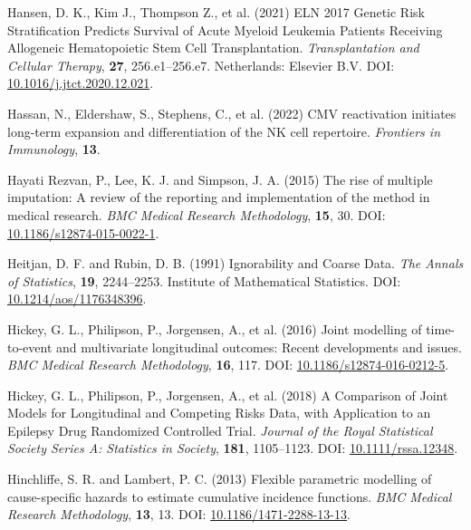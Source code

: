 \documentclass[
  letterpaper,
  DIV=11,
  numbers=noendperiod]{scrreprt}
\newlength{\cslhangindent}
\newenvironment{CSLReferences}[2] %
 {\begin{list}{}{%
  \setlength{\itemindent}{0pt}
  \setlength{\leftmargin}{0pt}
  \setlength{\parsep}{0pt}
  \ifodd #1
   \setlength{\leftmargin}{\cslhangindent}
   \setlength{\itemindent}{-1\cslhangindent}
  \fi
  \setlength{\itemsep}{#2\baselineskip}}}
 {\end{list}}
\begin{document}
\begin{CSLReferences}{1}{1}
Hansen, D. K., Kim J., Thompson Z., et al. (2021) {ELN} 2017 {Genetic
Risk Stratification Predicts Survival} of {Acute Myeloid Leukemia
Patients Receiving Allogeneic Hematopoietic Stem Cell Transplantation}.
\emph{Transplantation and Cellular Therapy}, \textbf{27},
256.e1--256.e7. Netherlands: Elsevier B.V. DOI:
\href{https://doi.org/10.1016/j.jtct.2020.12.021}{10.1016/j.jtct.2020.12.021}.

Hassan, N., Eldershaw, S., Stephens, C., et al. (2022) {CMV}
reactivation initiates long-term expansion and differentiation of the
{NK} cell repertoire. \emph{Frontiers in Immunology}, \textbf{13}.

Hayati Rezvan, P., Lee, K. J. and Simpson, J. A. (2015) The rise of
multiple imputation: A review of the reporting and implementation of the
method in medical research. \emph{BMC Medical Research Methodology},
\textbf{15}, 30. DOI:
\href{https://doi.org/10.1186/s12874-015-0022-1}{10.1186/s12874-015-0022-1}.

Heitjan, D. F. and Rubin, D. B. (1991) Ignorability and {Coarse Data}.
\emph{The Annals of Statistics}, \textbf{19}, 2244--2253. Institute of
Mathematical Statistics. DOI:
\href{https://doi.org/10.1214/aos/1176348396}{10.1214/aos/1176348396}.

Hickey, G. L., Philipson, P., Jorgensen, A., et al. (2016) Joint
modelling of time-to-event and multivariate longitudinal outcomes:
Recent developments and issues. \emph{BMC Medical Research Methodology},
\textbf{16}, 117. DOI:
\href{https://doi.org/10.1186/s12874-016-0212-5}{10.1186/s12874-016-0212-5}.

Hickey, G. L., Philipson, P., Jorgensen, A., et al. (2018) A
{Comparison} of {Joint Models} for {Longitudinal} and {Competing Risks
Data}, with {Application} to an {Epilepsy Drug Randomized Controlled
Trial}. \emph{Journal of the Royal Statistical Society Series A:
Statistics in Society}, \textbf{181}, 1105--1123. DOI:
\href{https://doi.org/10.1111/rssa.12348}{10.1111/rssa.12348}.

Hinchliffe, S. R. and Lambert, P. C. (2013) Flexible parametric
modelling of cause-specific hazards to estimate cumulative incidence
functions. \emph{BMC Medical Research Methodology}, \textbf{13}, 13.
DOI:
\href{https://doi.org/10.1186/1471-2288-13-13}{10.1186/1471-2288-13-13}.


\end{CSLReferences}
\end{document}

